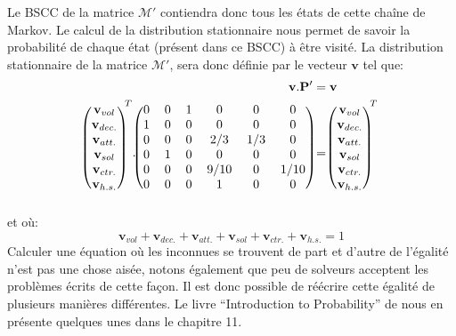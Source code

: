 \documentclass[letterpaper]{article}
\begin{document}
      Le BSCC de la matrice $\mathcal{M}'$ contiendra donc tous les états de cette
      chaîne de Markov.  Le calcul de la distribution stationnaire nous permet
      de savoir la probabilité de chaque état (présent dans ce BSCC) à être visité.
      La distribution stationnaire de la matrice $\mathcal{M}'$, sera donc définie
      par le vecteur $\mathbf{v}$ tel que:
      \begin{align*}
	\mathbf{v} . \mathbf{P}' &= \mathbf{v}\\
	\begin{blockarray}{(c)}
	  \mathbf{v}_{vol}\\
	  \mathbf{v}_{dec.}\\
	  \mathbf{v}_{att.}\\
	  \mathbf{v}_{sol}\\
	  \mathbf{v}_{ctr.}\\
	  \mathbf{v}_{h.s.}
	\end{blockarray}^T .
	\begin{blockarray}{(cccccc)}
	    0 & 0 & 1 & 0    & 0   & 0    \\
	    1 & 0 & 0 & 0    & 0   & 0    \\
	    0 & 0 & 0 & 2/3  & 1/3 & 0    \\
	    0 & 1 & 0 & 0    & 0   & 0    \\
	    0 & 0 & 0 & 9/10 & 0   & 1/10 \\
	    0 & 0 & 0 & 1    & 0   & 0    \\
	\end{blockarray}
	&=
	\begin{blockarray}{(c)}
	  \mathbf{v}_{vol}\\
	  \mathbf{v}_{dec.}\\
	  \mathbf{v}_{att.}\\
	  \mathbf{v}_{sol}\\
	  \mathbf{v}_{ctr.}\\
	  \mathbf{v}_{h.s.}
	\end{blockarray}^T
      \end{align*}
      et où:
      $$\mathbf{v}_{vol} + \mathbf{v}_{dec.} + \mathbf{v}_{att.} + \mathbf{v}_{sol} +
	\mathbf{v}_{ctr.} + \mathbf{v}_{h.s.} = 1$$
      Calculer une équation où les inconnues se trouvent de part et d'autre de l'égalité
      n'est pas une chose aisée, notons également que peu de solveurs acceptent les
      problèmes écrits de cette façon.  Il est donc possible de réécrire cette égalité
      de plusieurs manières différentes.  Le livre  ``Introduction to Probability''
      de \cite{IP} nous en présente quelques unes dans le chapitre 11.
\end{document}
